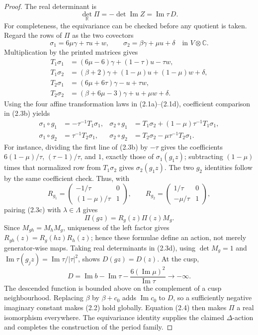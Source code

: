 \begin{proof}
The real determinant is
\[
 \det_{\mathbb R}\Pi=-\det\operatorname{Im}Z
 =\operatorname{Im}\tau\,D.
\tag{2.4}
\]
For completeness, the equivariance can be checked before any quotient is
taken.  Regard the rows of \(\Pi\) as the two covectors
\[
 \sigma_1=6\mu\gamma+\tau u+w,
 \qquad
 \sigma_2=\beta\gamma+\mu u+\delta
 \quad\text{in }V\otimes\mathbb C.
 \tag{2.3a}
\]
Multiplication by the printed matrices gives
\[
\begin{aligned}
T_1\sigma_1&=(6\mu-6)\gamma+(1-\tau)u-\tau w,\\
T_1\sigma_2&=(\beta+2)\gamma+(1-\mu)u+(1-\mu)w+\delta,\\
T_2\sigma_1&=(6\mu+6\tau)\gamma-u+\tau w,\\
T_2\sigma_2&=(\beta+6\mu-3)\gamma+u+\mu w+\delta.
\end{aligned}
\tag{2.3b}
\]
Using the four affine transformation laws in (2.1a)--(2.1d), coefficient
comparison in (2.3b) yields
\[
\begin{aligned}
 \sigma_1\circ g_1&=-\tau^{-1}T_1\sigma_1,
 &\sigma_2\circ g_1&=T_1\sigma_2+(1-\mu)\tau^{-1}T_1\sigma_1,\\
 \sigma_1\circ g_2&=\tau^{-1}T_2\sigma_1,
 &\sigma_2\circ g_2&=T_2\sigma_2-\mu\tau^{-1}T_2\sigma_1.
\end{aligned}
\tag{2.3c}
\]
For instance, dividing the first line of (2.3b) by \(-\tau\) gives the
coefficients \(6(1-\mu)/\tau\), \((\tau-1)/\tau\), and \(1\), exactly
those of \(\sigma_1(g_1z)\); subtracting \((1-\mu)\) times that normalized
row from \(T_1\sigma_2\) gives \(\sigma_2(g_1z)\).  The two \(g_2\)
identities follow by the same coefficient check.  Thus, with
\[
R_{g_1}=\begin{pmatrix}-1/\tau&0\\(1-\mu)/\tau&1\end{pmatrix},
\qquad
R_{g_2}=\begin{pmatrix}1/\tau&0\\-\mu/\tau&1\end{pmatrix},
\]
pairing (2.3c) with \(\lambda\in\Lambda\) gives
\[
 \Pi(gz)=R_g(z)\Pi(z)M_g.
 \tag{2.3d}
\]
Since \(M_{gh}=M_hM_g\), uniqueness of the left factor gives
\(R_{gh}(z)=R_g(hz)R_h(z)\); hence these formulae define an action, not
merely generator-wise maps.  Taking real determinants in (2.3d), using
\(\det M_g=1\) and
\(\operatorname{Im}\tau(g_jz)=\operatorname{Im}\tau/|\tau|^2\), shows
\(D(gz)=D(z)\).  At the cusp,
\[
 D=\operatorname{Im}b-\operatorname{Im}\tau-
 \frac{6(\operatorname{Im}\mu)^2}{\operatorname{Im}\tau}
 \longrightarrow-\infty.
\]
The descended function is bounded above on the complement of a cusp
neighbourhood.  Replacing \(\beta\) by \(\beta+c_0\) adds
\(\operatorname{Im}c_0\) to \(D\), so a sufficiently negative imaginary
constant makes (2.2) hold globally.  Equation (2.4) then makes \(\Pi\) a real
isomorphism everywhere.  The equivariance identity supplies the claimed
\(\Delta\)-action and completes the construction of the period family.
\end{proof}

